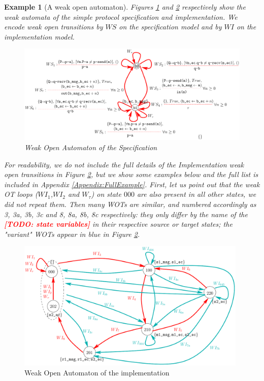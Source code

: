 \documentclass{lmcs}
\newcommand{\TODO}[1]{\textcolor{red}{\textbf{[TODO:#1]}}}
\newtheorem{example}{Example}
\begin{document}
  \begin{example}[A weak open automaton]
    Figures \ref{SimpleProtCounter:WeakSpecOA} and \ref{SimpleProtCounter:ImplWOA2} respectively show the weak automata of the simple protocol specification and implementation. We encode weak open transitions  by $WS$ on the specification model and by $WI$ on the implementation model.
    



\begin{figure}[h]
   \centerline{\includegraphics[width=15cm]{XFIG/SPSpecWeakOpen}}
  \caption{Weak Open Automaton of the Specification}
   \label{SimpleProtCounter:WeakSpecOA}
\end{figure}

 For readability, we do not include the full details of the Implementation weak open transitions in Figure \ref{SimpleProtCounter:ImplWOA2}, but we show some examples below and the full list is included in Appendix \ref{Appendix:FullExample}.
First, let us point out that the weak OT loops ($WI_1$,$WI_2$ and $W_\tau$) on state ${000}$ are also present in all other states, we did not repeat them. Then many WOTs are similar, and numbered accordingly as 3, 3a, 3b, 3c and 8, 8a, 8b, 8c respectively: they only differ by the name of the \TODO{ state variables} in their respective source or target states; the "variant" WOTs appear in blue in   Figure \ref{SimpleProtCounter:ImplWOA2}.
\end{example}




\begin{figure}[h]
   \centerline{\includegraphics[width=11cm]{XFIG/SimpleProtImpl-WOA2}}
  \caption{Weak Open Automaton of the implementation}
   \label{SimpleProtCounter:ImplWOA2}
\end{figure}
\end{document}
